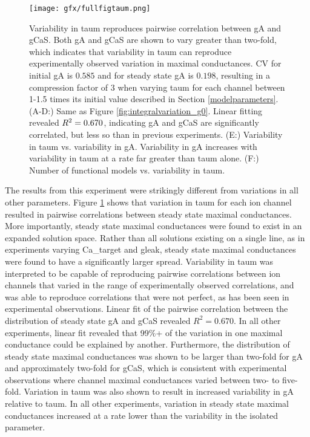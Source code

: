 \begin{figure}[H]
    \centering
    \begin{addmargin}[-2cm]{-3cm}
    \texttt{[image: gfx/fullfigtaum.png]}
    \end{addmargin}
\caption[Variability in \acs{taum} under integral control.]{Variability in \ac{taum} reproduces pairwise correlation between \ac{gA} and \ac{gCaS}. Both \ac{gA} and \ac{gCaS} are shown to vary greater than two-fold, which indicates that variability in \ac{taum} can reproduce experimentally observed variation in maximal conductances.\cite{golowasch_activity-dependent_1999} CV for initial \ac{gA} is $0.585$ and for steady state \ac{gA} is $0.198$, resulting in a compression factor of 3 when varying \ac{taum} for each channel between 1-1.5 times its initial value described in Section \ref{modelparameters}. (\textsc{A-D:}) Same as Figure \ref{fig:integralvariation_g0}. Linear fitting revealed \(R\textsuperscript{2} = 0.670\), indicating \ac{gA} and \ac{gCaS} are significantly correlated, but less so than in previous experiments. (\textsc{E:}) Variability in \ac{taum} vs. variability in \ac{gA}. Variability in \ac{gA} increases with variability in \ac{taum} at a rate far greater than \ac{taum} alone. (\textsc{F:}) Number of functional models vs. variability in \ac{taum}.}
    \label{fig:integralvariation_taum}
\end{figure}

The results from this experiment were strikingly different from variations in all other parameters. Figure \ref{fig:integralvariation_taum} shows that variation in \ac{taum} for each ion channel resulted in pairwise correlations between steady state maximal conductances. More importantly, steady state maximal conductances were found to exist in an expanded solution space. Rather than all solutions existing on a single line, as in experiments varying \ac{Ca_target} and \ac{gleak}, steady state maximal conductances were found to have a significantly larger spread. Variability in \ac{taum} was interpreted to be capable of reproducing pairwise correlations between ion channels that varied in the range of experimentally observed correlations, and was able to reproduce correlations that were not perfect, as has been seen in experimental observations\cite{santin_membrane_2019}. Linear fit of the pairwise correlation between the distribution of steady state \ac{gA} and \ac{gCaS} revealed $R^2 = 0.670$. In all other experiments, linear fit revealed that 99\%+ of the variation in one maximal conductance could be explained by another. Furthermore, the distribution of steady state maximal conductances was shown to be larger than two-fold for \ac{gA} and approximately two-fold for \ac{gCaS}, which is consistent with experimental observations where channel maximal conductances varied between two- to five-fold\cite{golowasch_activity-dependent_1999}. Variation in \ac{taum} was also shown to result in increased variability in \ac{gA} relative to \ac{taum}. In all other experiments, variation in steady state maximal conductances increased at a rate lower than the variability in the isolated parameter.

